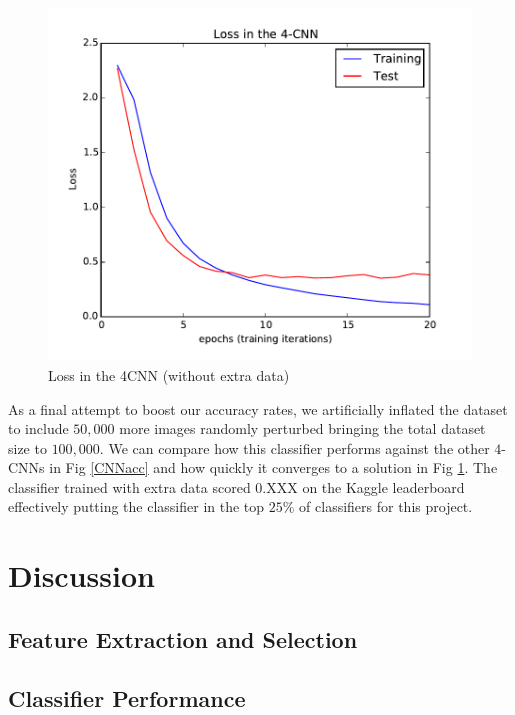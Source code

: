 \documentclass[conference]{IEEEtran}
\begin{document}
\begin{figure}[h]
	\centering
	\includegraphics[scale=0.6]{4CNNloss.pdf}
	\caption{Loss in the 4CNN (without extra data)}
	\label{C4NNacc}
\end{figure}

As a final attempt to boost our accuracy rates, we artificially inflated the dataset to include $50,000$ more images randomly perturbed bringing the total dataset size to $100,000$. We can compare how this classifier performs against the other $4$-CNNs in Fig \ref{CNNacc} and how quickly it converges to a solution in Fig \ref{C4NNacc}. The classifier trained with extra data scored 0.XXX on the Kaggle leaderboard effectively putting the classifier in the top $25\%$ of classifiers for this project.


\section{Discussion}


\subsection{Feature Extraction and Selection}



\subsection{Classifier Performance}
\end{document}
